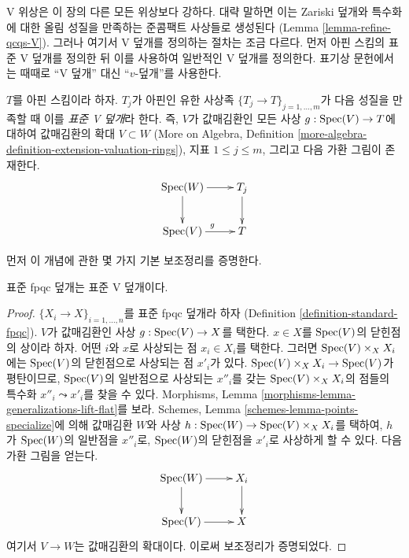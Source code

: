 \noindent
V 위상은 이 장의 다른 모든 위상보다 강하다. 대략 말하면 이는 Zariski
덮개와 특수화에 대한 올림 성질을 만족하는 준콤팩트 사상들로 생성된다
(Lemma \ref{lemma-refine-qcqs-V}). 그러나 여기서 V 덮개를 정의하는
절차는 조금 다르다. 먼저 아핀 스킴의 표준 V 덮개를 정의한 뒤 이를 사용하여
일반적인 V 덮개를 정의한다. 표기상 문헌에서는 때때로 ``V 덮개'' 대신
``$v$-덮개''를 사용한다.

\begin{definition}
\label{definition-standard-V-covering}
$T$를 아핀 스킴이라 하자. $T_j$가 아핀인 유한 사상족
$\{T_j \to T\}_{j = 1, \ldots, m}$가 다음 성질을 만족할 때 이를
{\it 표준 V 덮개}라 한다. 즉, $V$가 값매김환인 모든 사상
$g : \mathop{\mathrm{Spec}}(V) \to T$에 대하여 값매김환의 확대 $V \subset W$
(More on Algebra, Definition
\ref{more-algebra-definition-extension-valuation-rings}), 지표
$1 \leq j \leq m$, 그리고 다음 가환 그림이 존재한다.
$$
\xymatrix{
\Spec(W) \ar[r] \ar[d] & T_j \ar[d] \\
\Spec(V) \ar[r]^g & T
}
$$
\end{definition}

\noindent
먼저 이 개념에 관한 몇 가지 기본 보조정리를 증명한다.

\begin{lemma}
\label{lemma-standard-fpqc-standard-V}
표준 fpqc 덮개는 표준 V 덮개이다.
\end{lemma}

\begin{proof}
$\{X_i \to X\}_{i = 1, \ldots, n}$를 표준 fpqc 덮개라 하자
(Definition \ref{definition-standard-fpqc}). $V$가 값매김환인 사상
$g : \mathop{\mathrm{Spec}}(V) \to X$를 택한다. $x \in X$를 $\mathop{\mathrm{Spec}}(V)$의 닫힌점의 상이라
하자. 어떤 $i$와 $x$로 사상되는 점 $x_i \in X_i$를 택한다. 그러면
$\mathop{\mathrm{Spec}}(V) \times_X X_i$에는 $\mathop{\mathrm{Spec}}(V)$의 닫힌점으로 사상되는 점
$x'_i$가 있다. $\mathop{\mathrm{Spec}}(V) \times_X X_i \to \mathop{\mathrm{Spec}}(V)$가 평탄이므로,
$\mathop{\mathrm{Spec}}(V)$의 일반점으로 사상되는 $x''_i$를 갖는
$\mathop{\mathrm{Spec}}(V) \times_X X_i$의 점들의 특수화 $x''_i \leadsto x'_i$를 찾을 수
있다. Morphisms, Lemma \ref{morphisms-lemma-generalizations-lift-flat}를
보라. Schemes, Lemma \ref{schemes-lemma-points-specialize}에 의해 값매김환
$W$와 사상 $h : \mathop{\mathrm{Spec}}(W) \to \mathop{\mathrm{Spec}}(V) \times_X X_i$를 택하여, $h$가
$\mathop{\mathrm{Spec}}(W)$의 일반점을 $x''_i$로, $\mathop{\mathrm{Spec}}(W)$의 닫힌점을 $x'_i$로 사상하게
할 수 있다.
다음 가환 그림을 얻는다.
$$
\xymatrix{
\Spec(W) \ar[r] \ar[d] & X_i \ar[d] \\
\Spec(V) \ar[r] & X
}
$$
여기서 $V \to W$는 값매김환의 확대이다. 이로써 보조정리가 증명되었다.
\end{proof}

